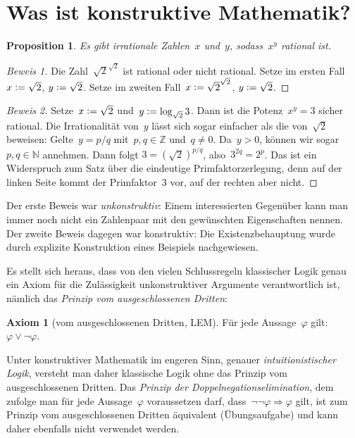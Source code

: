 \documentclass[a4paper,ngerman,12pt]{scrartcl}
\theoremstyle{definition}
\newtheorem{axiom}[defn]{Axiom}
\theoremstyle{plain}
\newtheorem{prop}[defn]{Proposition}
\theoremstyle{remark}
\newcommand{\ZZ}{\mathbb{Z}}
\newcommand{\NN}{\mathbb{N}}
\renewcommand{\_}{\mathpunct{.}\,}
\newcommand{\?}{\,{:}\,}
\newcommand{\defeq}{\vcentcolon=}
\begin{document}
\makeatletter
\renewcommand{\contentsline}[4]{#2\par\vspace{0.5em}}
\makeatother

\newpage

\section{Was ist konstruktive Mathematik?}

\begin{prop}Es gibt irrationale Zahlen~$x$ und~$y$, sodass~$x^y$ rational ist.
\end{prop}
\begin{proof}[Beweis 1] Die Zahl~$\sqrt{2}^{\sqrt{2}}$ ist rational oder nicht
rational. Setze im ersten Fall~$x \defeq \sqrt{2}$, $y \defeq \sqrt{2}$. Setze im
zweiten Fall~$x \defeq \sqrt{2}^{\sqrt{2}}$, $y \defeq \sqrt{2}$.
\end{proof}
\begin{proof}[Beweis 2] Setze~$x \defeq \sqrt{2}$ und~$y \defeq \log_{\sqrt{2}} 3$.
Dann
ist die Potenz~$x^y = 3$ sicher rational. Die Irrationalität von~$y$ lässt sich
sogar einfacher als die von~$\sqrt{2}$ beweisen:
Gelte~$y = p/q$ mit~$p, q \in \ZZ$ und~$q \neq 0$. Da~$y > 0$, können wir
sogar~$p, q \in \NN$ annehmen.
Dann folgt $3 = (\sqrt{2})^{p/q}$, also~$3^{2q} = 2^p$. Das ist ein
Widerspruch zum Satz über die eindeutige Primfaktorzerlegung, denn auf der linken
Seite kommt der Primfaktor~$3$ vor, auf der rechten aber nicht.
\end{proof}

Der erste Beweis war \emph{unkonstruktiv}: Einem interessierten Gegenüber kann
man immer noch nicht ein Zahlenpaar mit den gewünschten Eigenschaften nennen.
Der zweite Beweis dagegen war konstruktiv: Die Existenzbehauptung wurde durch
explizite Konstruktion eines Beispiels nachgewiesen.

Es stellt sich heraus, dass von den vielen Schlussregeln klassischer Logik genau
ein Axiom für die Zulässigkeit unkonstruktiver Argumente verantwortlich ist,
nämlich das \emph{Prinzip vom ausgeschlossenen Dritten}:
\begin{axiom}[vom ausgeschlossenen Dritten, LEM]Für jede Aussage~$\varphi$ gilt: $\varphi \vee
\neg\varphi$.\end{axiom}
Unter konstruktiver Mathematik im engeren Sinn, genauer
\emph{intuitionistischer Logik}, versteht man daher klassische Logik ohne das
Prinzip vom ausgeschlossenen Dritten.
Das \emph{Prinzip der Doppelnegationselimination}, dem zufolge man für jede
Aussage~$\varphi$ voraussetzen darf, dass~$\neg\neg\varphi \Rightarrow \varphi$
gilt, ist zum Prinzip vom ausgeschlossenen Dritten äquivalent (Übungsaufgabe) und kann daher ebenfalls nicht
verwendet werden.
\end{document}
